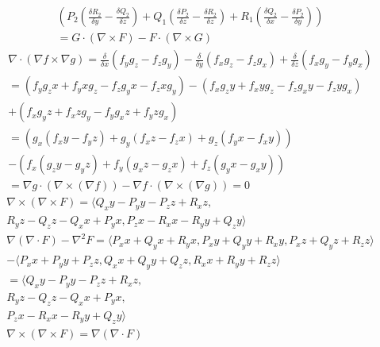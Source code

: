 \documentclass[12pt]{exam}
\begin{document}
\begin{questions}
\begin{solution}
\begin{questions}
\begin{gather*}
                    \left( P_2 \left(\frac{\delta R_2}{\delta y} - \frac{\delta Q_2}{\delta z} \right) + Q_1 \left(\frac{\delta P_2}{\delta z} - \frac{\delta R_2}{\delta z} \right)  + R_1 \left(\frac{\delta Q_2}{\delta x} - \frac{\delta P_2}{\delta y} \right)  \right) \\
                    = G \cdot (\nabla \times F) - F \cdot (\nabla \times G)
                \end{gather*} 
            \question
                \begin{gather*}
                    \nabla \cdot (\nabla f \times \nabla g) = \frac{\delta }{\delta x}(f_y g_z - f_z g_y) - \frac{\delta }{\delta y} (f_x g_z - f_z g_x) + \frac{\delta }{\delta z} (f_x g_y - f_y g_x) \\
                    = (f_y g_zx + f_yx g_z- f_z g_yx - f_zx g_y) - (f_x g_zy + f_xy g_z - f_z g_xy - f_zy g_x) \\ + (f_x g_yz + f_xz g_y - f_y g_xz + f_yz g_x) \\
                    = (g_x(f_xy - f_yz) + g_y(f_xz - f_zx) + g_z(f_yx - f_xy)) \\ - (f_x (g_zy - g_yz) + f_y(g_xz - g_zx) + f_z(g_yx - g_xy)) \\
                    = \nabla g \cdot (\nabla \times (\nabla f)) - \nabla f \cdot (\nabla \times (\nabla g)) = 0
                \end{gather*}
            \question
                \begin{gather*}
                    \nabla \times (\nabla \times F) = \langle Q_xy - P_yy -P_zz + R_xz, \\ R_yz - Q_zz - Q_xx + P_yx, P_zx - R_xx - R_yy + Q_zy \rangle \\
                    \nabla(\nabla \cdot F) - \nabla^2 F = \langle P_xx + Q_yx + R_yx, P_xy + Q_yy + R_xy, P_xz + Q_yz + R_zz \rangle \\ - \langle P_xx + P_yy + P_zz, Q_xx + Q_yy + Q_zz, R_xx + R_yy + R_zz \rangle \\
                    = \langle Q_xy - P_yy -P_zz + R_xz,\\ R_yz - Q_zz - Q_xx + P_yx,\\ P_zx - R_xx - R_yy + Q_zy \rangle \\
                    \nabla \times (\nabla \times F) = \nabla(\nabla \cdot F)
                \end{gather*}
        \end{questions}
    \end{solution}
    \clearpage

\end{questions}
\end{document}
